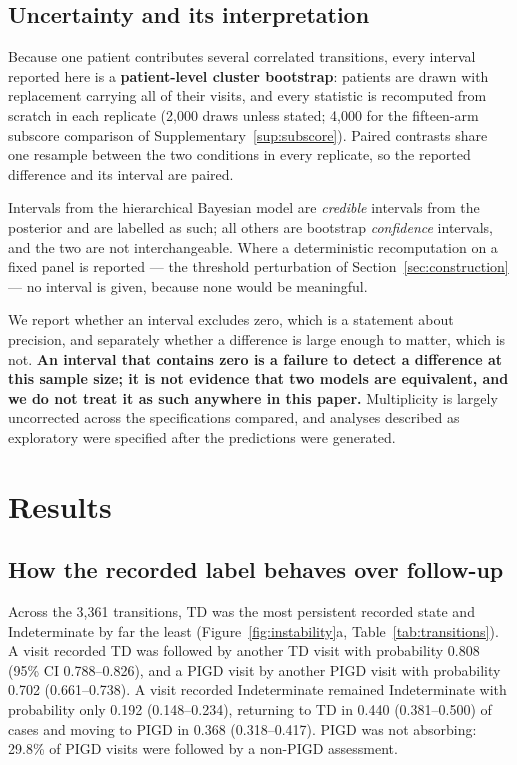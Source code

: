 \documentclass[11pt]{article}
\begin{document}
\subsection{Uncertainty and its interpretation}
Because one patient contributes several correlated transitions, every interval
reported here is a \textbf{patient-level cluster bootstrap}: patients are drawn
with replacement carrying all of their visits, and every statistic is recomputed
from scratch in each replicate (2,000 draws unless stated; 4,000 for the
fifteen-arm subscore comparison of Supplementary~\ref{sup:subscore}). Paired
contrasts share one resample between the two conditions in every replicate, so
the reported difference and its interval are paired.

Intervals from the hierarchical Bayesian model are \emph{credible} intervals from
the posterior and are labelled as such; all others are bootstrap
\emph{confidence} intervals, and the two are not interchangeable. Where a
deterministic recomputation on a fixed panel is reported --- the threshold
perturbation of Section~\ref{sec:construction} --- no interval is given, because
none would be meaningful.

We report whether an interval excludes zero, which is a statement about
precision, and separately whether a difference is large enough to matter, which
is not. \textbf{An interval that contains zero is a failure to detect a difference
at this sample size; it is not evidence that two models are equivalent, and we do
not treat it as such anywhere in this paper.} Multiplicity is largely uncorrected
across the specifications compared, and analyses described as exploratory were
specified after the predictions were generated.

\section{Results}

\subsection{How the recorded label behaves over follow-up}
\label{sec:dynamics}

Across the 3,361 transitions, TD was the most persistent recorded state and
Indeterminate by far the least (Figure~\ref{fig:instability}a,
Table~\ref{tab:transitions}). A visit recorded TD was followed by another TD
visit with probability 0.808 (95\% CI 0.788--0.826), and a PIGD visit by another
PIGD visit with probability 0.702 (0.661--0.738). A visit recorded Indeterminate
remained Indeterminate with probability only 0.192 (0.148--0.234), returning to
TD in 0.440 (0.381--0.500) of cases and moving to PIGD in 0.368 (0.318--0.417).
PIGD was not absorbing: 29.8\% of PIGD visits were followed by a non-PIGD
assessment.
\end{document}
